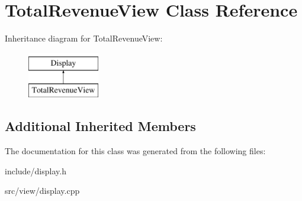 \hypertarget{classTotalRevenueView}{}\section{Total\+Revenue\+View Class Reference}
\label{classTotalRevenueView}
Inheritance diagram for Total\+Revenue\+View\+:\begin{figure}[H]
\begin{center}
\leavevmode
\includegraphics[height=2.000000cm]{classTotalRevenueView}
\end{center}
\end{figure}
\subsection*{Additional Inherited Members}


The documentation for this class was generated from the following files\+:\begin{DoxyCompactItemize}
\item 
include/display.\+h\item 
src/view/display.\+cpp\end{DoxyCompactItemize}
